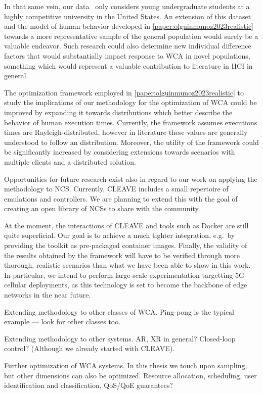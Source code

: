 In that same vein, our data~\cite{olguinmunoz:impact2021} only considers young undergraduate students at a highly competitive university in the United States.
An extension of this dataset and the model of human behavior developed in \cref{paper:olguinmunoz2023realistic} towards a more representative sample of the general population would surely be a valuable endeavor.
Such research could also determine new individual difference factors that would substantially impact response to \gls{WCA} in novel populations, something which would represent a valuable contribution to literature in \gls{HCI} in general.

The optimization framework employed in \cref{paper:olguinmunoz2023realistic} to study the implications of our methodology for the optimization of \gls{WCA} could be improved by expanding it towards distributions which better describe the behavior of human execution times.
Currently, the framework assumes executions times are Rayleigh-distributed, however in literature these values are generally understood to follow an  distribution.
Moreover, the utility of the framework could be significantly increased by considering extensions towards scenarios with multiple clients and a distributed solution.

\medskip
Opportunities for future research exist also in regard to our work on applying the methodology to \gls{NCS}.
Currently, \gls{CLEAVE} includes a small repertoire of emulations and controllers.
We are planning to extend this with the goal of creating an open library of \glspl{NCS} to share with the community.




At the moment, the interactions of \gls{CLEAVE} and tools such as Docker are still quite superficial.
Our goal is to achieve a much tighter integration, e.g.\ by providing the toolkit as pre-packaged container images.
Finally, the validity of the results obtained by the framework will have to be verified through more thorough, realistic scenarios than what we have been able to show in this work.
In particular, we intend to perform large-scale experimentation targetting 5G cellular deployments, as this technology is set to become the backbone of edge networks in the near future.







Extending methodology to other classes of \gls{WCA}.
Ping-pong is the typical example --- look for other classes too.

Extending methodology to other systems.
\gls{AR}, \gls{XR} in general?
Closed-loop control? (Although we already started with CLEAVE).

Further optimization of \gls{WCA} systems.
In this thesis we touch upon sampling, but other dimensions can also be optimized.
Resource allocation, scheduling, user identification and classification, QoS/QoE guarantees?
